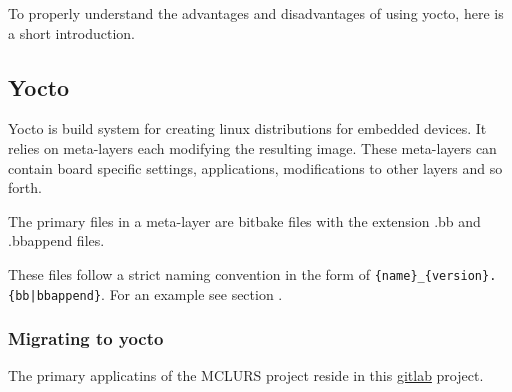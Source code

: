 \documentclass[../../main.tex]{subfiles}
\begin{document}
To properly understand the advantages and disadvantages of using yocto, here is a short introduction.

\subsection{Yocto}%
\label{sub:yocto}

Yocto is build system for creating linux distributions for embedded devices. It relies on meta-layers
each modifying the resulting image. These meta-layers can contain board specific settings,
applications, modifications to other layers and so forth.

The primary files in a meta-layer are bitbake files with the extension .bb and .bbappend files.

These files follow a strict naming convention in the form of
\texttt{\{name\}\_\{version\}.\{bb|bbappend\}}. For an example see section .



%
%
%
%
%



\subsubsection{Migrating to yocto}%
\label{ssub:migrating_to_yocto}

The primary applicatins of the MCLURS project reside in this
\href{https://gitlab.com/esrl/mclurs.git }{gitlab} project.
\end{document}
